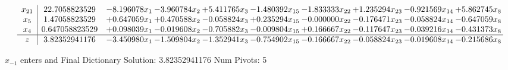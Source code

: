 \documentclass[10pt]{article}
\begin{document}
\[\begin{array}{c| c c@{\hskip 2pt} c@{\hskip 2pt} c@{\hskip 2pt} c@{\hskip 2pt} c@{\hskip 2pt} c@{\hskip 2pt} c@{\hskip 2pt} c@{\hskip 2pt} }
 x_{21}   &  22.7058823529 & -8.196078 x_{1} & -3.960784 x_{2} & + 5.411765 x_{3} & -1.480392 x_{15} & -1.833333 x_{22} & + 1.235294 x_{23} & -0.921569 x_{14} & + 5.862745 x_{8}\\
 x_{5}   &  1.47058823529 & + 0.647059 x_{1} & + 0.470588 x_{2} & -0.058824 x_{3} & + 0.235294 x_{15} & -0.000000 x_{22} & -0.176471 x_{23} & -0.058824 x_{14} & -0.647059 x_{8}\\
 x_{4}   &  0.647058823529 & + 0.098039 x_{1} & -0.019608 x_{2} & -0.705882 x_{3} & -0.009804 x_{15} & + 0.166667 x_{22} & -0.117647 x_{23} & -0.039216 x_{14} & -0.431373 x_{8}\\
\hline
z    &  3.82352941176 & -3.450980 x_{1} & -1.509804 x_{2} & -1.352941 x_{3} & -0.754902 x_{15} & -0.166667 x_{22} & -0.058824 x_{23} & -0.019608 x_{14} & -0.215686 x_{8}\\
\end{array}\]


 $ x_{-1} $ enters and Final Dictionary
Solution:  3.82352941176
Num Pivots:  5
\end{document}
